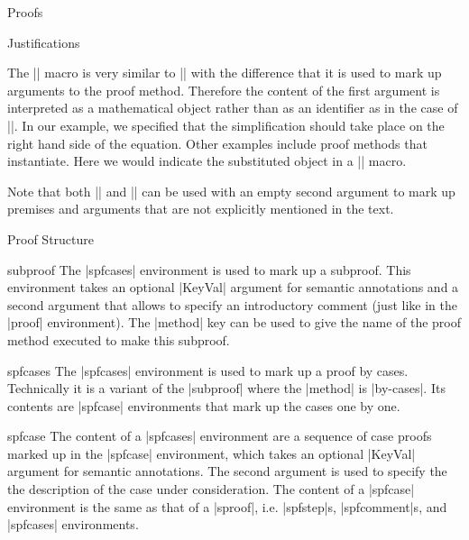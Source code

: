 \begin{sfragment}{Proofs}
\begin{sfragment}{Justifications}
  
  \begin{function}{\justarg}
    The |\justarg| macro is very similar to |\premise| with the difference that it is used
    to mark up arguments to the proof method. Therefore the content of the first argument
    is interpreted as a mathematical object rather than as an identifier as in the case of
    |\premise|. In our example, we specified that the simplification should take place on
    the right hand side of the equation. Other examples include proof methods that
    instantiate. Here we would indicate the substituted object in a |\justarg| macro.
  \end{function}

  Note that both |\premise| and |\justarg| can be used with an empty second argument to
  mark up premises and arguments that are not explicitly mentioned in the text.
\end{sfragment}

\begin{sfragment}{Proof Structure}

  \begin{environment}{subproof}
    The |spfcases| environment is used to mark up a subproof. This environment takes an
    optional |KeyVal| argument for semantic annotations and a second argument that allows
    to specify an introductory comment (just like in the |proof| environment). The
    |method| key can be used to give the name of the proof method
    executed to make this subproof.
  \end{environment}
  
  \begin{environment}{spfcases}
    The |spfcases| environment is used to mark up a proof by cases. Technically it is a
    variant of the |subproof| where the |method| is |by-cases|. Its contents are |spfcase|
    environments that mark up the cases one by one.
  \end{environment}

  \begin{environment}{spfcase}
    The content of a |spfcases| environment are a sequence of case proofs marked up in the
    |spfcase| environment, which takes an optional |KeyVal| argument for semantic
    annotations. The second argument is used to specify the the description of the case
    under consideration. The content of a |spfcase| environment is the same as that of a
    |sproof|, i.e. |spfstep|s, |spfcomment|s, and |spfcases| environments.
  \end{environment}
  

\end{sfragment}
\end{sfragment}
